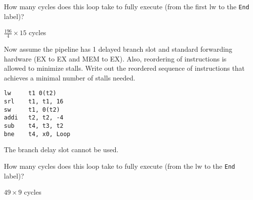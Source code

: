 \begin{blocksection}
\question How many cycles does this loop take to fully execute (from the first lw to the \texttt{End} label)?

\begin{solution}[0.5in]
$\frac{196}{4} \times 15$  cycles
\end{solution}

\question Now assume the pipeline has 1 delayed branch slot and standard forwarding hardware (EX to EX and MEM to EX). Also, reordering of instructions is allowed to minimize stalls. Write out the reordered sequence of instructions that achieves a minimal number of stalls needed. 

\begin{solution}[0.7in]
\begin{verbatim}
lw 	   t1 0(t2)
srl    t1, t1, 16
sw     t1, 0(t2)
addi   t2, t2, -4
sub    t4, t3, t2
bne    t4, x0, Loop
\end{verbatim}
The branch delay slot cannot be used. 
\end{solution}

\question How many cycles does this loop take to fully execute (from the lw to the \texttt{End} label)?

\begin{solution}[0.5in]
$49 \times 9$ cycles
\end{solution}

\end{blocksection}